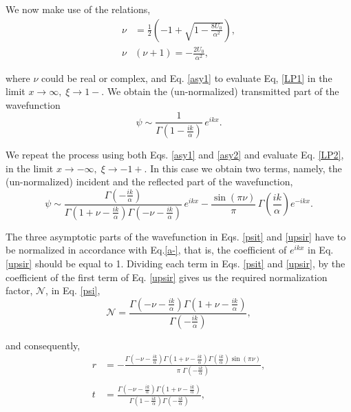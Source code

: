 \documentclass{article}
\numberwithin{equation}{section}
\begin{document}
{We now make use of the relations,
\begin{align}
\nu&=\frac{1}{2}\left(-1+\sqrt{1-\frac{8U_0}{\alpha^2}}\right),\label{s1}\\
\nu&(\nu+1)=-\frac{2U_0}{\alpha^2},\label{s2}
\end{align}

where $\nu$ could be real or complex, and Eq. \eqref{asy1} to evaluate Eq, \eqref{LP1} in the limit $x\to \infty,\;\xi\to 1-$.  We obtain the (un-normalized) transmitted part of the wavefunction
\begin{equation}
\psi\sim\frac{1}{\Gamma\left(1-\frac{ik}{\alpha}\right)}\,e^{ikx}.\label{psit}
\end{equation}

We repeat the process using both Eqs. \eqref{asy1} and \eqref{asy2} and evaluate Eq. \eqref{LP2}, in the limit $x\to -\infty,\;\xi\to -1+$.  In this case we obtain two terms, namely, the (un-normalized) incident and the reflected part of the wavefunction,
\begin{equation}
\psi\sim\frac{\Gamma\left(-\frac{ik}{\alpha}\right)}{\Gamma\left(1+\nu-\frac{ik}{\alpha}\right)\Gamma\left(-\nu-\frac{ik}{\alpha}\right)}\,e^{ikx}-\frac{\sin{(\pi\nu)}}{\pi}\,\Gamma\left(\frac{ik}{\alpha}\right)e^{-ikx}.\label{upsir}
\end{equation}

The three asymptotic parts of the wavefunction in Eqs. \eqref{psit} and \eqref{upsir} have to be normalized in accordance with Eq.\eqref{a-}, that is, the coefficient of $e^{ikx}$ in Eq. \eqref{upsir} should be equal to 1.  Dividing each term in Eqs. \eqref{psit} and \eqref{upsir}, by the coefficient of the first term of Eq. \eqref{upsir} gives us the required normalization factor, $\mathcal{N}$, in Eq. \eqref{psi},
\begin{equation}
\mathcal{N}=\frac{\Gamma\left(-\nu-\frac{ik}{\alpha}\right)\Gamma\left(1+\nu-\frac{ik}{\alpha}\right)}{\Gamma\left(-\frac{ik}{\alpha}\right)},\label{N}
\end{equation}

and consequently,
\begin{align}
r&=-\frac{\Gamma\left(-\nu-\frac{ik}{\alpha}\right)\Gamma\left(1+\nu-\frac{ik}{\alpha}\right)\Gamma\left(\frac{ik}{\alpha}\right)\sin{(\pi\nu)}}{\pi\;\Gamma\left(-\frac{ik}{\alpha}\right)},\label{Lr}\\\nonumber\\
t&=\frac{\Gamma\left(-\nu-\frac{ik}{\alpha}\right)\Gamma\left(1+\nu-\frac{ik}{\alpha}\right)}{\Gamma\left(1-\frac{ik}{\alpha}\right)\Gamma\left(-\frac{ik}{\alpha}\right)},\label{Lt}
\end{align}

}
\end{document}
